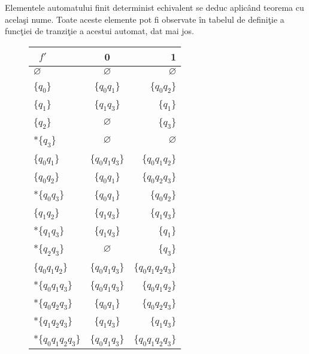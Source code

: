\begin{enumerate}
\begin{figure}[H]
\end{figure}

Elementele automatului finit determinist echivalent se deduc aplicând teorema cu acelaşi nume. Toate aceste elemente pot fi observate în tabelul de definiţie a funcţiei de tranziţie a acestui automat, dat mai jos.

\begin{figure}[H]
\centering
\begin{tabular}{ l | c r }
   $\;\;f'$     &            0 &            1\\
   \hline
   $\varnothing$ & $\varnothing$ & $\varnothing$\\
   \{$q_{0}$\}	& 	\{$q_{0} q_{1}$\}	&	\{$q_{0} q_{2}$\}\\
   \{$q_{1}$\} 	&	 \{$q_{1} q_{3}$\}	 &	 \{$q_{1}$\}\\
   \{$q_{2}$\}	&	$\varnothing$		&	\{$q_{3}$\}\\
   *\{$q_{3}$\}	&	$\varnothing$	&	$\varnothing$\\
   \{$q_{0} q_{1}$\}		&	\{$q_{0} q_{1} q_{3}$\}	&	\{$q_{0} q_{1} q_{2}$\}\\
   \{$q_{0} q_{2}$\}	&	\{$q_{0} q_{1}$\} 	&	\{$q_{0} q_{2} q_{3}$\}\\
   *\{$q_{0} q_{3}$\}		& \{$q_{0} q_{1}$\}	&	 \{$q_{0} q_{2}$\}\\
   \{$q_{1} q_{2}$\}		&	 \{$q_{1} q_{3}$\}  &	\{$q_{1} q_{3}$\}\\
   *\{$q_{1} q_{3}$\} 	&	 \{$q_{1} q_{3}$\}	&	\{$q_{1}$\}\\
   *\{$q_{2} q_{3}$\}  	&	$\varnothing$	&	\{$q_{3}$\}\\
   \{$q_{0} q_{1} q_{2}$\}	&	\{$q_{0} q_{1} q_{3}\}$	&	\{$q_{0} q_{1} q_{2} q_{3}$\}\\
   *\{$q_{0} q_{1} q_{3}$\}	&	\{$q_{0} q_{1} q_{3}\}$	&	\{$q_{0} q_{1} q_{2}$\}\\
   *\{$q_{0} q_{2} q_{3}$\}	&	\{$q_{0} q_{1}$\}		&	\{$q_{0} q_{2} q_{3}$\}\\
   *\{$q_{1} q_{2} q_{3}$\}	&	\{$q_{1} q_{3}\}$	&	\{$q_{1} q_{3}$\}\\
   *\{$q_{0} q_{1} q_{2} q_{3}$\}	&	\{$q_{0} q_{1} q_{3}$\}	&	 \{$q_{0} q_{1} q_{2} q_{3}$\}\\
\end{tabular}


\end{figure}
\end{enumerate}
